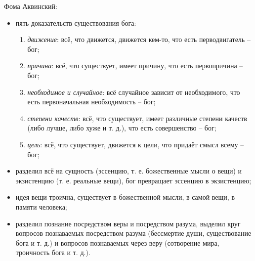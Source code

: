 Фома Аквинский:
\begin{itemize}
	\itemsep-1ex
	\item пять доказательств существования бога:
	\begin{enumerate}
		\itemsep-.5ex
		\item \textit{движение}: всё, что движется, движется кем-то, что есть перводвигатель -- бог;
		\item \textit{причина}: всё, что существует, имеет причину, что есть первопричина -- бог;
		\item \textit{необходимое и случайное}: всё случайное зависит от необходимого, что есть первоначальная необходимость -- бог;
		\item \textit{степени качеств}: всё, что существует, имеет различные степени качеств (либо лучше, либо хуже и т. д.), что есть совершенство -- бог;
		\item \textit{цель}: всё, что существует, движется к цели, что придаёт смысл всему -- бог;
	\end{enumerate}
	\item разделил всё на сущность (эссенцию, т. е. божественные мысли о вещи) и экзистенцию (т. е. реальные вещи), бог превращает эссенцию в экзистенцию;
	\item идея вещи троична, существует в божественной мысли, в самой вещи, в памяти человека;
	\item разделил познание посредством веры и посредством разума, выделил круг вопросов познаваемых посредством разума (бессмертие души, существование бога и т. д.) и вопросов познаваемых через веру (сотворение мира, троичность бога и т. д.).
\end{itemize}